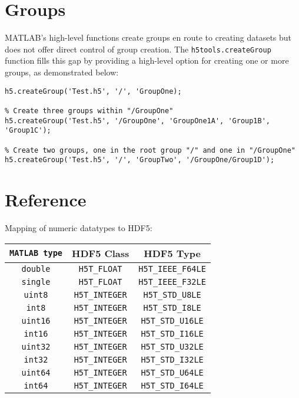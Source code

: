 \documentclass[11pt]{exam}
\newcommand\myfcn[1]{\colorbox{codegray}{\textcolor{codeblue}{\texttt{#1}}}}
\begin{document}
	\section{Groups}
		\noindent MATLAB's high-level functions create groups en route to creating datasets but does not offer direct control of group creation. The \myfcn{h5tools.createGroup} function fills this gap by providing a high-level option for creating one or more groups, as demonstrated below:
		\begin{lstlisting}[style=matlab-editor, basicstyle=\mlttfamily\footnotesize]
% Create one group within the root group "/"
h5.createGroup('Test.h5', '/', 'GroupOne);

% Create three groups within "/GroupOne"
h5.createGroup('Test.h5', '/GroupOne', 'GroupOne1A', 'Group1B', 'Group1C');

% Create two groups, one in the root group "/" and one in "/GroupOne"
h5.createGroup('Test.h5', '/', 'GroupTwo', '/GroupOne/Group1D');
		\end{lstlisting}
		

    \section{Reference}
    \noindent Mapping of numeric datatypes to HDF5:\\$\quad$\vspace{-1ex}\\
    \begin{center}
    \begin{tabular}{| c | c | c |}
        \hline
        \texttt{MATLAB type} & \textbf{HDF5 Class} & \textbf{HDF5 Type}\\
        \hline
        \texttt{double} & \texttt{H5T\_FLOAT} & \texttt{H5T\_IEEE\_F64LE}\\
        \texttt{single} & \texttt{H5T\_FLOAT} & \texttt{H5T\_IEEE\_F32LE}\\
        \texttt{uint8} & \texttt{H5T\_INTEGER} & \texttt{H5T\_STD\_U8LE}\\
        \texttt{int8} & \texttt{H5T\_INTEGER} & \texttt{H5T\_STD\_I8LE}\\
        \texttt{uint16} & \texttt{H5T\_INTEGER} & \texttt{H5T\_STD\_U16LE}\\
        \texttt{int16} & \texttt{H5T\_INTEGER} & \texttt{H5T\_STD\_I16LE}\\
        \texttt{uint32} & \texttt{H5T\_INTEGER} & \texttt{H5T\_STD\_U32LE}\\
        \texttt{int32} & \texttt{H5T\_INTEGER} & \texttt{H5T\_STD\_I32LE}\\
        \texttt{uint64} & \texttt{H5T\_INTEGER} & \texttt{H5T\_STD\_U64LE}\\
        \texttt{int64} & \texttt{H5T\_INTEGER} & \texttt{H5T\_STD\_I64LE}\\
        \hline
    \end{tabular}
    \end{center}
\end{document}
